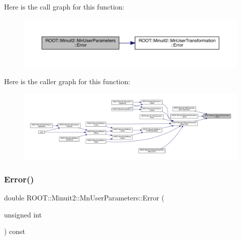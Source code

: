Here is the call graph for this function\+:
\nopagebreak
\begin{figure}[H]
\begin{center}
\leavevmode
\includegraphics[width=350pt]{d6/d10/classROOT_1_1Minuit2_1_1MnUserParameters_a08122c2515f2f3505ae14a26f7112dcc_cgraph}
\end{center}
\end{figure}
Here is the caller graph for this function\+:
\nopagebreak
\begin{figure}[H]
\begin{center}
\leavevmode
\includegraphics[width=350pt]{d6/d10/classROOT_1_1Minuit2_1_1MnUserParameters_a08122c2515f2f3505ae14a26f7112dcc_icgraph}
\end{center}
\end{figure}
\mbox{\label{classROOT_1_1Minuit2_1_1MnUserParameters_a08122c2515f2f3505ae14a26f7112dcc}} 
\subsubsection{\texorpdfstring{Error()}{Error()}\hspace{0.1cm}{\footnotesize\ttfamily [2/6]}}
{\footnotesize\ttfamily double R\+O\+O\+T\+::\+Minuit2\+::\+Mn\+User\+Parameters\+::\+Error (\begin{DoxyParamCaption}\item[{unsigned int}]{ }\end{DoxyParamCaption}) const}

\mbox{\label{classROOT_1_1Minuit2_1_1MnUserParameters_a08122c2515f2f3505ae14a26f7112dcc}} 
